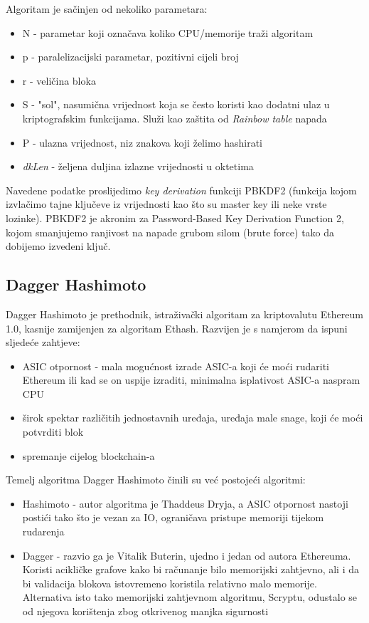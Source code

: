 \documentclass[12pt]{article}
\begin{document}
\pagebreak
Algoritam je sačinjen od nekoliko parametara:
\begin{itemize}
	\item N - parametar koji označava koliko CPU/memorije traži algoritam
	\item p - paralelizacijski parametar, pozitivni cijeli broj
	\item r - veličina bloka
	\item S - "sol", nasumična vrijednost koja se često koristi kao dodatni ulaz u kriptografskim funkcijama. Služi kao zaštita od \textit{Rainbow table} napada
	\item P - ulazna vrijednost, niz znakova koji želimo hashirati
	\item \textit{dkLen} - željena duljina izlazne vrijednosti u oktetima
\end{itemize}
%
Navedene podatke proslijedimo \textit{key derivation} funkciji PBKDF2 (funkcija kojom izvlačimo tajne ključeve iz vrijednosti kao što su master key ili neke vrste lozinke). PBKDF2 je akronim za Password-Based Key Derivation Function 2, kojom smanjujemo ranjivost na napade grubom silom (brute force) tako da dobijemo izvedeni ključ.\cite{scrypt}

\subsection{Dagger Hashimoto}
Dagger Hashimoto je prethodnik, istraživački algoritam za kriptovalutu Ethereum 1.0, kasnije zamijenjen za algoritam Ethash. Razvijen je s namjerom da ispuni sljedeće zahtjeve:
\begin{itemize}
	\item ASIC otpornost - mala mogućnost izrade ASIC-a koji će moći rudariti Ethereum ili kad se on uspije izraditi, minimalna isplativost ASIC-a naspram CPU
	\item širok spektar različitih jednostavnih uređaja, uređaja male snage, koji će moći potvrditi blok
	\item spremanje cijelog blockchain-a
\end{itemize}

\pagebreak
Temelj algoritma Dagger Hashimoto činili su već postojeći algoritmi:
\begin{itemize}
	\item Hashimoto - autor algoritma je Thaddeus Dryja, a ASIC otpornost nastoji postići tako što je vezan za IO, ograničava pristupe memoriji tijekom rudarenja 
	\item Dagger - razvio ga je Vitalik Buterin, ujedno i jedan od autora Ethereuma. Koristi acikličke grafove kako bi računanje bilo memorijski zahtjevno, ali i da bi validacija blokova istovremeno koristila relativno malo memorije. Alternativa isto tako memorijski zahtjevnom algoritmu, Scryptu, odustalo se od njegova korištenja zbog otkrivenog manjka sigurnosti
	\cite{dagger-hashimoto}
\end{itemize}
\end{document}
